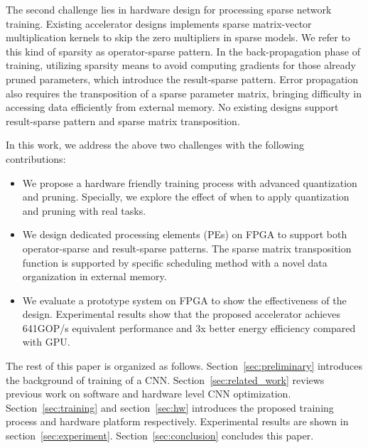 The second challenge lies in hardware design for processing sparse network training. Existing accelerator designs implements sparse matrix-vector multiplication kernels to skip the zero multipliers in sparse models. We refer to this kind of sparsity as operator-sparse pattern. In the back-propagation phase of training, utilizing sparsity means to avoid computing gradients for those already pruned parameters, which introduce the result-sparse pattern. Error propagation also requires the transposition of a sparse parameter matrix, bringing difficulty in accessing data efficiently from external memory. No existing designs support result-sparse pattern and sparse matrix transposition.

In this work, we address the above two challenges with the following contributions:

\begin{itemize}
  \item We propose a hardware friendly training process with advanced quantization and pruning. Specially, we explore the effect of when to apply quantization and pruning with real tasks.
  \item We design dedicated processing elements (PEs) on FPGA to support both operator-sparse and result-sparse patterns. The sparse matrix transposition function is supported by specific scheduling method with a novel data organization in external memory.
  \item We evaluate a prototype system on FPGA to show the effectiveness of the design. Experimental results show that the proposed accelerator achieves 641GOP/s equivalent performance and 3x better energy efficiency compared with GPU.
\end{itemize}

The rest of this paper is organized as follows. Section~\ref{sec:preliminary} introduces the background of training of a CNN. Section~\ref{sec:related_work} reviews previous work on software and hardware level CNN optimization. Section~\ref{sec:training} and section~\ref{sec:hw} introduces the proposed training process and hardware platform respectively. Experimental results are shown in section~\ref{sec:experiment}. Section~\ref{sec:conclusion} concludes this paper.
